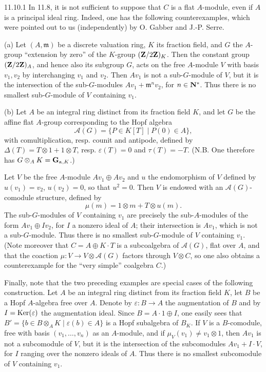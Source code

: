 \begin{remark}{11.10.1}\label{VIB.11.10.1}
In 11.8, it is not sufficient to suppose that $C$ is a flat $A$-module, even if $A$ is a principal ideal ring. Indeed, one has the following counterexamples, which were pointed out to us (independently) by O. Gabber and J.-P. Serre.

(a) Let $(A,\mathfrak m)$ be a discrete valuation ring, $K$ its fraction field, and $G$ the $A$-group ``extension by zero'' of the $K$-group $(\mathbf{Z}/2\mathbf{Z})_K$. Then the constant group $(\mathbf{Z}/2\mathbf{Z})_A$, and hence also its subgroup $G$, acts on the free $A$-module $V$ with basis $v_1,v_2$ by interchanging $v_1$ and $v_2$. Then $Av_1$ is not a sub-$G$-module of $V$, but it is the intersection of the sub-$G$-modules $Av_1+\mathfrak m^n v_2$, for $n\in\mathbf{N}^*$. Thus there is no smallest sub-$G$-module of $V$ containing $v_1$.

(b) Let $A$ be an integral ring distinct from its fraction field $K$, and let $G$ be the affine flat $A$-group corresponding to the Hopf algebra
\[
\mathscr A(G)=\{P\in K[T]\mid P(0)\in A\},
\]
with comultiplication, resp. counit and antipode, defined by $\Delta(T)=T\otimes1+1\otimes T$, resp. $\varepsilon(T)=0$ and $\tau(T)=-T$. (N.B. One therefore has $G\otimes_A K=\mathbf{G}_{\mathrm{a}}{}_{,K}$.)

Let $V$ be the free $A$-module $Av_1\oplus Av_2$ and $u$ the endomorphism of $V$ defined by $u(v_1)=v_2$, $u(v_2)=0$, so that $u^2=0$. Then $V$ is endowed with an $\mathscr A(G)$-comodule structure, defined by
\[
\mu(m)=1\otimes m+T\otimes u(m).
\]
The sub-$G$-modules of $V$ containing $v_1$ are precisely the sub-$A$-modules of the form $Av_1\oplus Iv_2$, for $I$ a nonzero ideal of $A$; their intersection is $Av_1$, which is not a sub-$G$-module. Thus there is no smallest sub-$G$-module of $V$ containing $v_1$. (Note moreover that $C=A\oplus K\cdot T$ is a subcoalgebra of $\mathscr A(G)$, flat over $A$, and that the coaction $\mu:V\to V\otimes\mathscr A(G)$ factors through $V\otimes C$, so one also obtains a counterexample for the ``very simple'' coalgebra $C$.)

Finally, note that the two preceding examples are special cases of the following construction. Let $A$ be an integral ring distinct from its fraction field $K$, let $B$ be a Hopf $A$-algebra free over $A$. Denote by $\varepsilon:B\to A$ the augmentation of $B$ and by $I=\operatorname{Ker}(\varepsilon)$ the augmentation ideal. Since $B=A\cdot1\oplus I$, one easily sees that $B'=\{b\in B\otimes_A K\mid\varepsilon(b)\in A\}$ is a Hopf subalgebra of $B_K$. If $V$ is a $B$-comodule, free with basis $(v_1,\ldots,v_n)$ as an $A$-module, and if $\mu_V(v_1)\ne v_1\otimes1$, then $Av_1$ is not a subcomodule of $V$, but it is the intersection of the subcomodules $Av_1+I\cdot V$, for $I$ ranging over the nonzero ideals of $A$. Thus there is no smallest subcomodule of $V$ containing $v_1$.
\end{remark}

